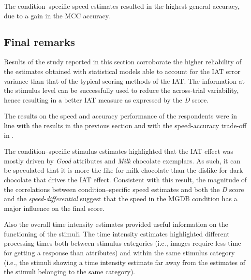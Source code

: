 \documentclass[12pt]{book}
\begin{document}
The condition--specific speed estimates resulted in the highest general accuracy, due to a gain in the MCC accuracy.  

\subsection{Final remarks}

Results of the study reported in this section corroborate the higher reliability of the estimates obtained with statistical models able to account for the IAT error variance than that of the typical scoring methods of the IAT.
The information at the stimulus level can be successfully used to reduce the across-trial variability, hence resulting in a better IAT measure as expressed by the \emph{D} score.

The results on the speed and accuracy performance of the respondents were in line with the results in the previous section and with the speed-accuracy trade-off in .  

The condition--specific stimulus estimates highlighted that the IAT effect was mostly driven by \emph{Good} attributes and \emph{Milk} chocolate exemplars. As such, it can be speculated that it is more the like for milk chocolate than the dislike for dark chocolate that drives the IAT effect. 
Consistent with this result, the magnitude of the correlations between condition--specific speed estimates and both the \emph{D} score and the \emph{speed-differential} suggest that the speed in the MGDB condition has a major influence on the final score. 

Also the overall time intensity estimates provided useful information on the functioning of the stimuli. 
The time intensity estimates highlighted different processing times both between stimulus categories (i.e., images require
less time for getting a response than attributes) and within the same stimulus category (i.e., the
stimuli showing a time intensity estimate far away from the estimates of the stimuli belonging
to the same category). 
\end{document}
